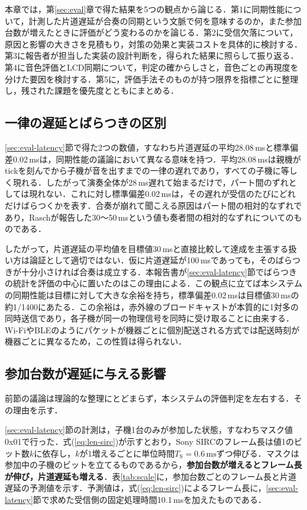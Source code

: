 \documentclass[uplatex,dvipdfmx]{jlreq}
\begin{document}
本章では，第\ref{sec:eval}章で得た結果を5つの観点から論じる．第1に同期性能について，計測した片道遅延が合奏の同期という文脈で何を意味するのか，また参加台数が増えたときに評価がどう変わるのかを論じる．第2に受信欠落について，原因と影響の大きさを見積もり，対策の効果と実装コストを具体的に検討する．第3に報告者が担当した実装の設計判断を，得られた結果に照らして振り返る．第4に音色評価とLCD同期について，判定の確からしさと，音色ごとの再現度を分けた要因を検討する．第5に，評価手法そのものが持つ限界を指標ごとに整理し，残された課題を優先度とともにまとめる．

\subsection{一律の遅延とばらつきの区別}
\label{sec:disc-jitter}

\ref{sec:eval-latency}節で得た2つの数値，すなわち片道遅延の平均28.08\,msと標準偏差0.02\,msは，同期性能の議論において異なる意味を持つ．平均28.08\,msは親機がtickを刻んでから子機が音を出すまでの一律の遅れであり，すべての子機に等しく現れる．したがって演奏全体が28\,ms遅れて始まるだけで，パート間のずれとしては現れない．これに対し標準偏差0.02\,msは，その遅れが受信のたびにどれだけばらつくかを表す．合奏が崩れて聞こえる原因はパート間の相対的なずれであり，Raschが報告した30〜50\,msという値も奏者間の相対的なずれについてのものである\cite{rasch}．

したがって，片道遅延の平均値を目標値30\,msと直接比較して達成を主張する扱い方は論証として適切ではない．仮に片道遅延が100\,msであっても，そのばらつきが十分小さければ合奏は成立する．本報告書が\ref{sec:eval-latency}節でばらつきの統計を評価の中心に置いたのはこの理由による．この観点に立てば本システムの同期性能は目標に対して大きな余裕を持ち，標準偏差0.02\,msは目標値30\,msの約1/1400にあたる．この余裕は，赤外線のブロードキャストが本質的に1対多の同時送信であり，各子機が同一の物理信号を同時に受け取ることに由来する．Wi-FiやBLEのようにパケットが機器ごとに個別配送される方式では配送時刻が機器ごとに異なるため，この性質は得られない．

\subsection{参加台数が遅延に与える影響}
\label{sec:disc-scale}

前節の議論は理論的な整理にとどまらず，本システムの評価判定を左右する．その理由を示す．

\ref{sec:eval-latency}節の計測は，子機1台のみが参加した状態，すなわちマスク値0x01で行った．式(\ref{eq:len-sirc})が示すとおり，Sony SIRCのフレーム長は値1のビット数$k$に依存し，$k$が1増えるごとに単位時間$T_\mathrm{S}=0.6\,\mathrm{ms}$ずつ伸びる．マスクは参加中の子機のビットを立てるものであるから，\textbf{参加台数が増えるとフレーム長が伸び，片道遅延も増える}．表\ref{tab:scale}に，参加台数ごとのフレーム長と片道遅延の予測値を示す．予測値は，式(\ref{eq:len-sirc})によるフレーム長に，\ref{sec:eval-latency}節で求めた受信側の固定処理時間10.1\,msを加えたものである．
\end{document}
